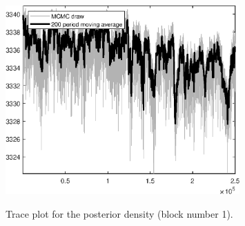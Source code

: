 \begin{figure}[H]
\centering
  \includegraphics[width=0.8\textwidth]{BRS_imp_mobility/graphs/TracePlot_Posterior_blck_1}\\
    \caption{Trace plot for the posterior density (block number 1).}
\end{figure}
